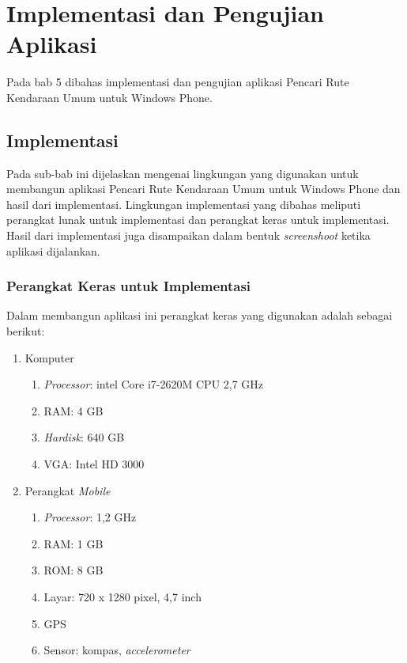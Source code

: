 \chapter{Implementasi dan Pengujian Aplikasi}
\label{chap:Implementasi dan Pengujian Aplikasi}

Pada bab 5 dibahas implementasi dan pengujian aplikasi Pencari Rute Kendaraan Umum untuk Windows Phone.

\section{Implementasi}
\label{lab:Implementasi}
\hspace{0.5cm} Pada sub-bab ini dijelaskan mengenai lingkungan yang digunakan untuk membangun aplikasi Pencari Rute Kendaraan Umum untuk Windows Phone dan hasil dari implementasi. Lingkungan implementasi yang dibahas meliputi perangkat lunak untuk implementasi dan perangkat keras untuk implementasi. Hasil dari implementasi juga disampaikan dalam bentuk \textit{screenshoot} ketika aplikasi dijalankan.

\subsection{Perangkat Keras untuk Implementasi}
\label{lab:Perangkat Keras untuk Implementasi}
\hspace{0.5cm} Dalam membangun aplikasi ini perangkat keras yang digunakan adalah sebagai berikut:
\begin{enumerate}
	\item Komputer
		\begin{enumerate}
			\item \textit{Processor}: intel Core i7-2620M CPU 2,7 GHz
			\item RAM: 4 GB
			\item \textit{Hardisk}: 640 GB
			\item VGA: Intel HD 3000
		\end{enumerate}
		
	\item Perangkat \textit{Mobile}
		\begin{enumerate}
			\item \textit{Processor}: 1,2 GHz
			\item RAM: 1 GB
			\item ROM: 8 GB
			\item Layar: 720 x 1280 pixel, 4,7 inch
			\item GPS
			\item Sensor: kompas, \textit{accelerometer}
		\end{enumerate}
\end{enumerate}

